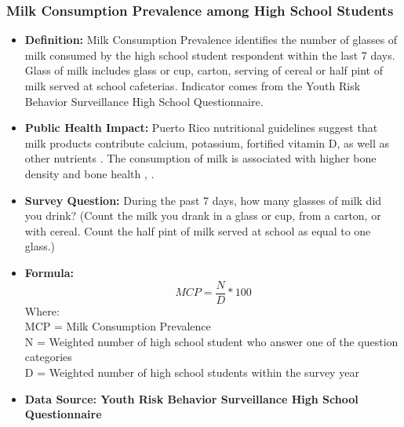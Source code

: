 \documentclass[12pt,letterpaper]{report}
\begin{document}
		\subsubsection{Milk Consumption Prevalence among High School Students} 
	\begin{itemize}
		\item \textbf{Definition:} Milk Consumption Prevalence identifies the number of glasses of milk consumed by the high school student respondent within the last 7 days. Glass of milk includes glass or cup, carton, serving of cereal or half pint of milk served at school cafeterias. Indicator comes from the Youth Risk Behavior Surveillance High School Questionnaire.
		\item \textbf{Public Health Impact:} Puerto Rico nutritional guidelines suggest that milk products contribute calcium, potassium, fortified vitamin D, as well as other nutrients \cite{GuiaAlimentariaPR}. The consumption of milk is associated with higher bone density and bone health \cite{sandler1985postmenopausal}, \cite{teegarden1999previous}.
		\item \textbf{Survey Question:} During the past 7 days, how many glasses of milk did you drink? (Count the milk you drank in a glass or cup, from a carton, or with cereal. Count the half pint of milk served at school as equal to one glass.)
		\item \textbf{Formula:} 
			\begin{equation}
				MCP = \frac{N}{D} *100
			\end{equation}
Where: \\
			MCP = Milk Consumption Prevalence \\
			
			N = Weighted number of high school student who answer one of the question categories\\
			
			D = Weighted number of high school students within the survey year \\
			
		\item \textbf{Data Source: Youth Risk Behavior Surveillance High School Questionnaire}
		
	\end{itemize}

\end{document}
